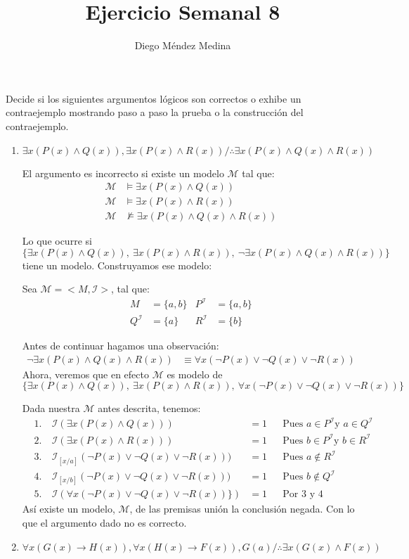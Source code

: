 \documentclass[8pt, letterpaper]{article}
\title{%
  Ejercicio Semanal 8\\
  {\large{}}}
\author{Diego Méndez Medina}
\date{}
\newcommand{\m}{\mathcal{M} }
\newcommand{\I}{\mathcal{I} }
\begin{document}
\ttfamily
\maketitle
\rmfamily

Decide si los siguientes argumentos lógicos son correctos o exhibe un
contraejemplo mostrando paso a paso la prueba o la construcción del
contraejemplo.
\begin{enumerate}
\item $\exists x(P(x)\land Q(x)), \exists x(P(x)\land R(x)) /
  \therefore \exists x(P(x)\land Q(x) \land R(x))$

  El argumento es incorrecto si existe un modelo $\m$ tal que:
  \begin{align*}
    \m &\models \exists x(P(x)\land Q(x))\\
    \m &\models\exists x(P(x)\land R(x))\\
    \m &\not\models \exists x(P(x)\land Q(x) \land R(x))
  \end{align*}
  
  Lo que ocurre si $\{\exists x(P(x)\land Q(x)),\ \exists x(P(x)\land R(x)),
  \ \neg \exists x(P(x)\land Q(x) \land R(x))\}$ tiene un modelo. Construyamos
  ese modelo:

  \hfill\break
  Sea $\m = <M, \I>$, tal que:
  \begin{align*}
    M &= \{a,b\} & P^\I &= \{a,b\}\\
    Q^\I &= \{a\} & R^\I &= \{b\}
  \end{align*}
  
  Antes de continuar hagamos una observación:
  \begin{align*}
    \neg \exists x(P(x)\land Q(x) \land R(x)) &\equiv
    \forall x(\neg P(x)\lor \neg Q(x) \lor\neg R(x))
  \end{align*}
  Ahora, veremos que en efecto $\m$ es modelo de
  $$\{\exists x(P(x)\land Q(x)),\
  \exists x(P(x)\land R(x)),\
  \forall x(\neg P(x)\lor \neg Q(x) \lor\neg R(x))\}$$

  \hspace*{0.5cm}Dada nuestra $\m$ antes descrita, tenemos:
  \begin{align*}
    &1.\  & \I (\exists x(P(x)\land Q(x))) &= 1 & &\text{Pues } a \in P^\I
    \text{y } a \in Q^\I\\
    &2.\  & \I (\exists x(P(x)\land R(x))) &= 1 & &\text{Pues } b \in P^\I
    \text{y } b \in R^\I\\
    &3.\  & \I_{[x/a]}(\neg P(x)\lor \neg Q(x) \lor\neg R(x))) &= 1 &
    &\text{Pues } a \notin R^\I\\
    &4.\  & \I_{[x/b]}(\neg P(x)\lor \neg Q(x) \lor\neg R(x))) &= 1 &
    &\text{Pues } b \notin Q^\I \\
    &5.\  & \I( \forall x(\neg P(x)\lor \neg Q(x) \lor\neg R(x))\}) &= 1 &
    &\text{Por $3$ y $4$}
  \end{align*}
  Así existe un modelo, $\m$, de las premisas unión la conclusión negada.
  Con lo que el argumento dado no es correcto.
  \newpage
\item $\forall x(G(x)\rightarrow H(x)), \forall x(H(x)\rightarrow F(x)),
  G(a)/\therefore \exists x(G(x) \land F(x))$


\end{enumerate}
\end{document}
